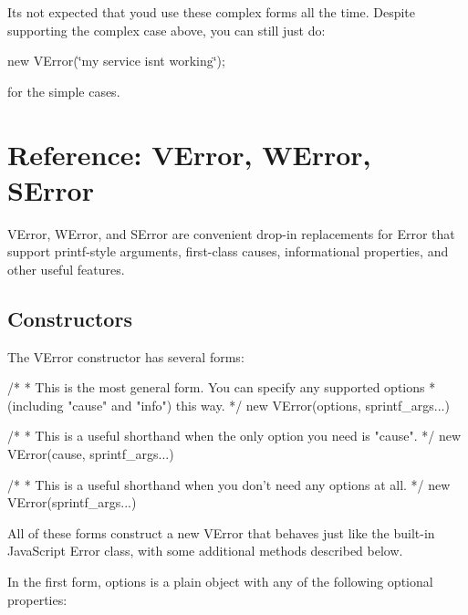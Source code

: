 It\textquotesingle{}s not expected that you\textquotesingle{}d use these complex forms all the time. Despite supporting the complex case above, you can still just do\+:

new V\+Error(\char`\"{}my service isn\textquotesingle{}t working\char`\"{});

for the simple cases.

\section*{Reference\+: V\+Error, W\+Error, S\+Error}

V\+Error, W\+Error, and S\+Error are convenient drop-\/in replacements for {\ttfamily Error} that support printf-\/style arguments, first-\/class causes, informational properties, and other useful features.

\subsection*{Constructors}

The V\+Error constructor has several forms\+:


\begin{DoxyCode}
/*
 * This is the most general form.  You can specify any supported options
 * (including "cause" and "info") this way.
 */
new VError(options, sprintf\_args...)

/*
 * This is a useful shorthand when the only option you need is "cause".
 */
new VError(cause, sprintf\_args...)

/*
 * This is a useful shorthand when you don't need any options at all.
 */
new VError(sprintf\_args...)
\end{DoxyCode}


All of these forms construct a new V\+Error that behaves just like the built-\/in Java\+Script {\ttfamily Error} class, with some additional methods described below.

In the first form, {\ttfamily options} is a plain object with any of the following optional properties\+:

